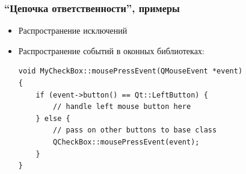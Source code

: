 \documentclass[xetex,mathserif,serif]{beamer}
\begin{document}
	\begin{frame}[fragile]
		\frametitle{``Цепочка ответственности'', примеры}
		\begin{itemize}
			\item Распространение исключений
			\item Распространение событий в оконных библиотеках:
			\begin{verbatim}
void MyCheckBox::mousePressEvent(QMouseEvent *event)
{
    if (event->button() == Qt::LeftButton) {
        // handle left mouse button here
    } else {
        // pass on other buttons to base class
        QCheckBox::mousePressEvent(event);
    }
}
			\end{verbatim}
		\end{itemize}
	\end{frame}
\end{document}
